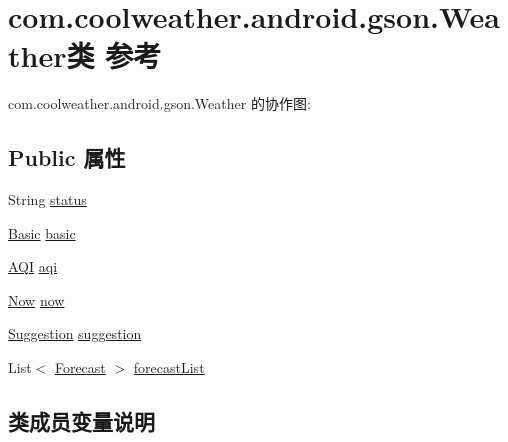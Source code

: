 \hypertarget{classcom_1_1coolweather_1_1android_1_1gson_1_1_weather}{}\section{com.\+coolweather.\+android.\+gson.\+Weather类 参考}
\label{classcom_1_1coolweather_1_1android_1_1gson_1_1_weather}


com.\+coolweather.\+android.\+gson.\+Weather 的协作图\+:
\subsection*{Public 属性}
\begin{DoxyCompactItemize}
\item 
String \mbox{\hyperlink{classcom_1_1coolweather_1_1android_1_1gson_1_1_weather_a45c80ad693c80a0cf5aeaa61f50bfa8b}{status}}
\item 
\mbox{\hyperlink{classcom_1_1coolweather_1_1android_1_1gson_1_1_basic}{Basic}} \mbox{\hyperlink{classcom_1_1coolweather_1_1android_1_1gson_1_1_weather_a7006fc6024f4a6a37db450e044782154}{basic}}
\item 
\mbox{\hyperlink{classcom_1_1coolweather_1_1android_1_1gson_1_1_a_q_i}{A\+QI}} \mbox{\hyperlink{classcom_1_1coolweather_1_1android_1_1gson_1_1_weather_a3ee52145d7857a493832036e7deccf89}{aqi}}
\item 
\mbox{\hyperlink{classcom_1_1coolweather_1_1android_1_1gson_1_1_now}{Now}} \mbox{\hyperlink{classcom_1_1coolweather_1_1android_1_1gson_1_1_weather_a0f99064214649174945599ac82973d25}{now}}
\item 
\mbox{\hyperlink{classcom_1_1coolweather_1_1android_1_1gson_1_1_suggestion}{Suggestion}} \mbox{\hyperlink{classcom_1_1coolweather_1_1android_1_1gson_1_1_weather_a23fb68b11b286f24df045e49887c9b96}{suggestion}}
\item 
List$<$ \mbox{\hyperlink{classcom_1_1coolweather_1_1android_1_1gson_1_1_forecast}{Forecast}} $>$ \mbox{\hyperlink{classcom_1_1coolweather_1_1android_1_1gson_1_1_weather_a6d132dd23065f6fda39408822daffe68}{forecast\+List}}
\end{DoxyCompactItemize}


\subsection{类成员变量说明}
\mbox{\label{classcom_1_1coolweather_1_1android_1_1gson_1_1_weather_a3ee52145d7857a493832036e7deccf89}} 
